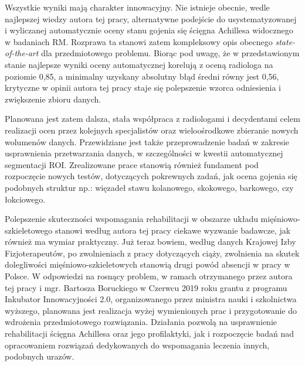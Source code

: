Wszystkie wyniki mają charakter innowacyjny. Nie istnieje obecnie, wedle najlepszej wiedzy autora tej pracy, alternatywne podejście do usystematyzowanej i wyliczanej automatycznie oceny stanu gojenia się ścięgna Achillesa widocznego w badaniach RM. Rozprawa ta stanowi zatem kompleksowy opis obecnego \textit{state-of-the-art} dla przedmiotowego problemu. Biorąc pod uwagę, że w przedstawionym stanie najlepsze wyniki oceny automatycznej korelują z oceną radiologa na poziomie 0,85, a minimalny uzyskany absolutny błąd średni równy jest 0,56, krytyczne w opinii autora tej pracy staje się polepszenie wzorca odniesienia i zwiększenie zbioru danych. 

Planowana jest zatem dalsza, stała współpraca z radiologami i decydentami celem realizacji ocen przez kolejnych specjalistów oraz wieloośrodkowe zbieranie nowych wolumenów danych. Przewidziane jest także przeprowadzenie badań w zakresie usprawnienia przetwarzania danych, w szczególności w kwestii automatycznej segmentacji ROI. Zrealizowane prace stanowią również fundament pod rozpoczęcie nowych testów, dotyczących pokrewnych zadań, jak ocena gojenia się podobnych struktur np.: więzadeł stawu kolanowego, skokowego, barkowego, czy łokciowego. 

Polepszenie skuteczności wspomagania rehabilitacji w obszarze układu mięśniowo-szkieletowego stanowi według autora tej pracy ciekawe wyzwanie badawcze, jak również ma wymiar praktyczny. Już teraz bowiem, według danych Krajowej Izby Fizjoterapeutów, po zwolnieniach z pracy dotyczących ciąży, zwolnienia na skutek dolegliwości mięśniowo-szkieletowych stanowią drugi powód absencji w pracy w Polsce. \linebreak W odpowiedzi na rosnący problem, w ramach otrzymanego przez autora tej pracy i mgr. Bartosza Boruckiego w Czerwcu 2019 roku grantu z programu Inkubator Innowacyjności 2.0, organizowanego przez ministra nauki i szkolnictwa wyższego, planowana jest realizacja wyżej wymienionych prac i przygotowanie do wdrożenia przedmiotowego rozwiązania. Działania pozwolą na usprawnienie rehabilitacji ścięgna Achillesa oraz jego profilaktyki, jak i rozpoczęcie badań nad opracowaniem rozwiązań dedykowanych do wspomagania leczenia innych, podobnych urazów.






